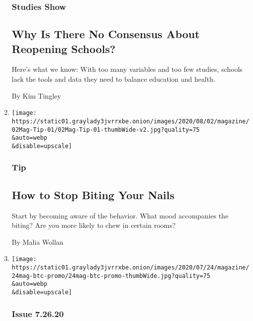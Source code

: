 \begin{enumerate}
  \hypertarget{studies-show}{%
  \subsubsection{Studies Show}\label{studies-show}}

  \hypertarget{why-is-there-no-consensus-about-reopening-schools}{%
  \subsection{Why Is There No Consensus About Reopening
  Schools?}\label{why-is-there-no-consensus-about-reopening-schools}}

  Here's what we know: With too many variables and too few studies,
  schools lack the tools and data they need to balance education and
  health.

  By Kim Tingley
\item
  \href{/2020/07/28/magazine/how-to-stop-biting-your-nails.html}{}

  \texttt{[image: https://static01.graylady3jvrrxbe.onion/images/2020/08/02/magazine/02Mag-Tip-01/02Mag-Tip-01-thumbWide-v2.jpg?quality=75\\\&auto=webp\\\&disable=upscale]}

  \hypertarget{tip-}{%
  \subsubsection{Tip }\label{tip-}}

  \hypertarget{how-to-stop-biting-your-nails}{%
  \subsection{How to Stop Biting Your
  Nails}\label{how-to-stop-biting-your-nails}}

  Start by becoming aware of the behavior. What mood accompanies the
  biting? Are you more likely to chew in certain rooms?

  By Malia Wollan
\item
  \href{/2020/07/24/magazine/behind-the-cover-climate-migration.html}{}

  \texttt{[image: https://static01.graylady3jvrrxbe.onion/images/2020/07/24/magazine/24mag-btc-promo/24mag-btc-promo-thumbWide.jpg?quality=75\\\&auto=webp\\\&disable=upscale]}

  \hypertarget{issue-72620}{%
  \subsubsection{Issue 7.26.20}\label{issue-72620}}


\end{enumerate}
